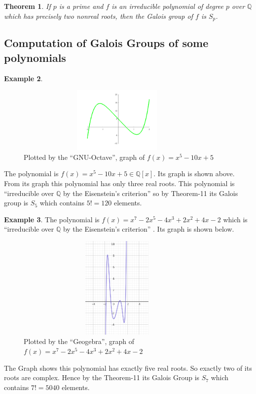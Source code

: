 \documentclass[11pt]{amsart}
\theoremstyle{plain}
\newtheorem{theorem}{Theorem}[section]
\theoremstyle{definition}
\newtheorem{example}[theorem]{Example}
\numberwithin{equation}{section}
\begin{document}
\vspace{7mm}
\begin{theorem} \cite{hunger}
If \(p\) is a prime and \(f\) is an irreducible polynomial of degree \(p\) over \(\mathbb{Q}\) which has precisely two nonreal roots, then the Galois group of \(f\) is \(S_p\).
\end{theorem}
\clearpage

\subsection{Computation of Galois Groups of some polynomials}
\begin{example}
   \begin{figure}[h!]
    \includegraphics[width=10cm, height=3.2cm]{quantic2.png}
    \caption{\footnotesize Plotted by the ``GNU-Octave'', graph of \(f(x)=x^5-10x+5\) }
  \end{figure}
  The polynomial is \(f(x)=x^5-10x+5 \in \mathbb{Q}[x]\). Its graph is shown above.\\
 From its graph this polynomial has only three real roots. This polynomial is ``irreducible over \(\mathbb{Q}\) by the Eisenstein's criterion'' \cite{hunger} so by Theorem-11 its Galois group is \(S_5\) which contains \(5!=120\) elements.
 \end{example}

\begin{example}
  The polynomial is \(f(x)=x^7-2x^5-4x^3+2x^2+4x-2\) which is ``irreducible over \(\mathbb{Q}\) by the Eisenstein's criterion'' \cite{hunger}. Its graph is shown below.

    \begin{figure}[h!]
    \includegraphics[width=10cm, height=5cm]{seventh2.png}
    \caption{\footnotesize Plotted by the ``Geogebra'', graph of \(f(x)=x^7-2x^5-4x^3+2x^2+4x-2\)}
  \end{figure}
The Graph shows this polynomial has exactly five real roots. So exactly two of its roots are complex. Hence by the Theorem-11 its Galois Group is \(S_7\) which contains \(7!=5040\) elements.
\end{example}
\end{document}
